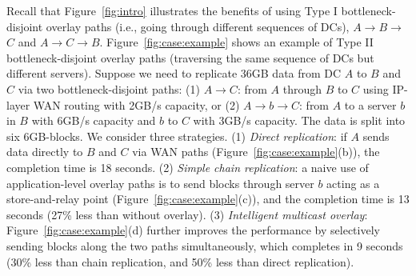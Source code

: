 Recall that Figure~\ref{fig:intro} illustrates the benefits of
using Type I bottleneck-disjoint overlay paths
(i.e., going through different sequences of DCs),
$A$$\rightarrow$$B$$\rightarrow$$C$ and
$A$$\rightarrow$$C$$\rightarrow$$B$.
Figure~\ref{fig:case:example} shows an example
of Type II bottleneck-disjoint overlay paths
(traversing the same sequence of DCs but different servers).
Suppose we need to replicate 36GB data from DC $A$
to $B$ and $C$ via two bottleneck-disjoint paths:
(1) $A$$\rightarrow$$C$:
from $A$ through $B$ to $C$ using IP-layer WAN routing with
2GB/s capacity, or
(2) $A$$\rightarrow$$b$$\rightarrow$$C$: from $A$ to a server
$b$ in $B$ with
6GB/s capacity and $b$ to $C$ with 3GB/s capacity.
The data is split into six 6GB-blocks.
We consider three strategies.
(1) {\em Direct replication}:
if $A$ sends data directly to $B$ and $C$ via WAN paths
(Figure~\ref{fig:case:example}(b)),
the completion time is 18 seconds.
(2) {\em Simple chain replication}:
a naive use of application-level overlay paths
is to send blocks through server $b$ acting as a
store-and-relay point
(Figure~\ref{fig:case:example}(c)),
and the completion time is 13 seconds (27\% less than without overlay).
(3) {\em Intelligent multicast overlay}:
Figure~\ref{fig:case:example}(d) further improves the performance by
selectively sending blocks along the two paths simultaneously,
which completes in 9 seconds (30\% less than chain replication,
and 50\% less than direct replication).



